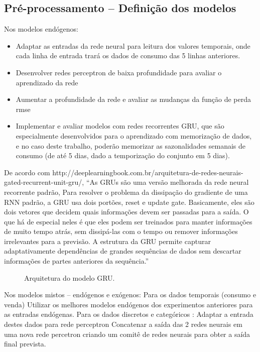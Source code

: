 \documentclass[	12pt, Times, openright, twoside, a4paper, english, brazil]{abntex2}
\begin{document}
        \subsection{Pré-processamento – Definição dos modelos}
         	Nos modelos endógenos: 
         	\begin{itemize}
             	\item   Adaptar as entradas da rede neural para leitura dos valores temporais, onde cada linha de entrada trará os dados de consumo das 5 linhas anteriores. 
                \item	Desenvolver redes perceptron de baixa profundidade para avaliar o aprendizado da rede
                \item	Aumentar a profundidade da rede e avaliar as mudanças da função de perda rmse
                \item	Implementar e avaliar modelos com redes recorrentes GRU, que são especialmente desenvolvidos para o aprendizado com memorização de dados, e no caso deste trabalho, poderão memorizar as sazonalidades semanais de consumo (de até 5 dias, dado a temporização do conjunto em 5 dias).
            \end{itemize}
            De acordo com http://deeplearningbook.com.br/arquitetura-de-redes-neurais-gated-recurrent-unit-gru/,  “As GRUs são uma versão melhorada da rede neural recorrente padrão, Para resolver o problema da dissipação do gradiente de uma RNN padrão, a GRU usa dois portões, reset e update gate. Basicamente, eles são dois vetores que decidem quais informações devem ser passadas para a saída. O que há de especial neles é que eles podem ser treinados para manter informações de muito tempo atrás, sem dissipá-las com o tempo ou remover informações irrelevantes para a previsão. A estrutura da GRU permite capturar adaptativamente dependências de grandes sequências de dados sem descartar informações de partes anteriores da sequência.”
        \begin{figure}[!ht]
    		\caption{Arquitetura do modelo GRU.\label{fig:gru-arch}}
	    \end{figure}
        Nos modelos mistos – endógenos e exógenos: 
            Para os dados temporais (consumo e venda)
            Utilizar os melhores modelos endógenos dos experimentos anteriores para as entradas endógenas. 
            Para os dados discretos e categóricos :
            Adaptar a entrada destes dados para rede perceptron
            Concatenar a saída das 2 redes neurais em uma nova rede percetron criando um comitê de redes neurais para obter a saída final prevista.
\end{document}
